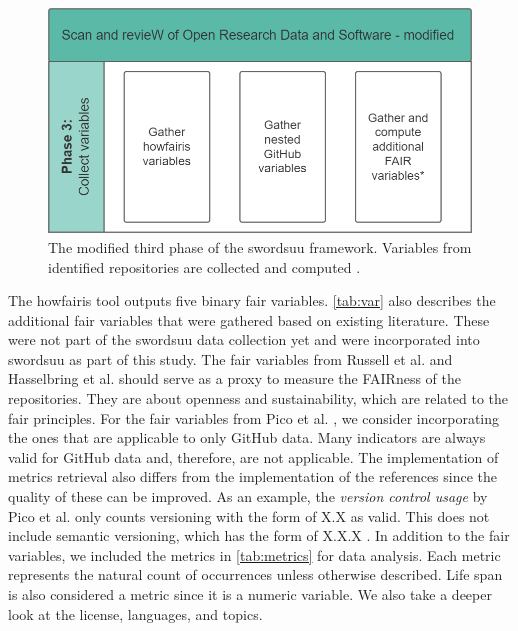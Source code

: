 \begin{figure}[h!]
\centering
\includegraphics[scale=0.4]{figures/SWORDS-thesis-phase3.drawio.png}
\caption{The modified third phase of the \acrshort{swordsuu} framework. Variables from identified repositories are collected and computed \cite{de_Bruin_Scan_and_revieW_2021}.
\label{fig:phase3}}
\vspace{-0.2cm}
\end{figure}

The howfairis tool outputs five binary \acrshort{fair} variables. \autoref{tab:var} also describes the additional \acrshort{fair} variables that were gathered based on existing literature. These were not part of the \acrshort{swordsuu} data collection yet and were incorporated into \acrshort{swordsuu} as part of this study. The \acrshort{fair} variables from Russell et al. \cite{russell_large-scale_2018} and Hasselbring et al. \cite{hasselbring_open_2020} should serve as a proxy to measure the FAIRness of the repositories. They are about openness and sustainability, which are related to the \acrshort{fair} principles. For the \acrshort{fair} variables from Pico et al. \cite{pico_fairsoft_2022}, we consider incorporating the ones that are applicable to only GitHub data. Many indicators are always valid for GitHub data and, therefore, are not applicable. The implementation of metrics retrieval also differs from the implementation of the references since the quality of these can be improved. As an example, the \textit{version control usage} by Pico et al. only counts versioning with the form of X.X as valid. This does not include semantic versioning, which has the form of X.X.X \cite{preston2013semantic}.
In addition to the \acrshort{fair} variables, we included the metrics in \autoref{tab:metrics} for data analysis. Each metric represents the natural count of occurrences unless otherwise described. Life span is also considered a metric since it is a numeric variable. We also take a deeper look at the license, languages, and topics. 




